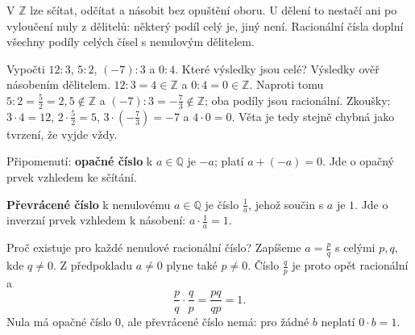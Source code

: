 \documentclass[11pt,a4paper]{article}
\begin{document}

\newpage
{}
V $\mathbb Z$ lze sčítat, odčítat a násobit bez opuštění oboru.
U dělení to nestačí ani po vyloučení nuly z dělitelů: některý podíl
celý je, jiný není. Racionální čísla doplní všechny podíly celých čísel
s nenulovým dělitelem.

\begin{prikladReseniBox}[title={Příklad 2},breakable=false]
Vypočti $12:3$, $5:2$, $(-7):3$ a $0:4$.
Které výsledky jsou celé? Výsledky ověř násobením dělitelem.
\tcblower
$12:3=4\in\mathbb Z$ a $0:4=0\in\mathbb Z$.
Naproti tomu $5:2=\frac52=2{,}5\notin\mathbb Z$ a
$(-7):3=-\frac73\notin\mathbb Z$; oba podíly jsou racionální.
Zkoušky: $3\cdot4=12$, $2\cdot\frac52=5$,
$3\cdot(-\frac73)=-7$ a $4\cdot0=0$.
Věta  je tedy stejně chybná
jako tvrzení, že vyjde vždy.
\end{prikladReseniBox}

\begin{definiceBox}[title={Definice - Opačné číslo}]
Připomenutí: \textbf{opačné číslo} k $a\in\mathbb Q$ je $-a$;
platí $a+(-a)=0$. Jde o opačný prvek vzhledem ke sčítání.
\end{definiceBox}

\begin{definiceBox}[title={Definice - Převrácené číslo}]
\textbf{Převrácené číslo} k nenulovému $a\in\mathbb Q$ je číslo $\frac1a$,
jehož součin s $a$ je $1$. Jde o inverzní prvek vzhledem k násobení:
$a\cdot\frac1a=1$.
\end{definiceBox}

Proč existuje pro každé nenulové racionální číslo? Zapíšeme
$a=\frac pq$ s celými $p,q$, kde $q\ne0$. Z předpokladu $a\ne0$ plyne
také $p\ne0$. Číslo $\frac qp$ je proto opět racionální a
\[
\frac pq\cdot\frac qp=\frac{pq}{qp}=1.
\]
Nula má opačné číslo $0$, ale převrácené číslo nemá:
pro žádné $b$ neplatí $0\cdot b=1$.
\end{document}
